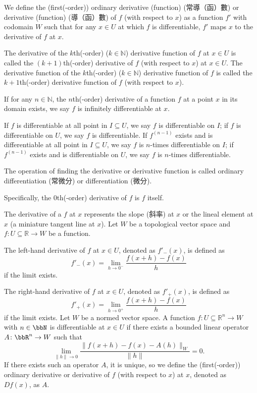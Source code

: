 \documentclass[a4paper,12pt]{report}
\begin{document}
\begin{itemize}
\begin{itemize}
We define the (first(-order)) ordinary derivative (function) (常導（函）數) or derivative (function) (導（函）數) of $f$ (with respect to $x$) as a function $f'$ with codomain $W$ such that for any $x\in U$ at which $f$ is differentiable, $f'$ maps $x$ to the derivative of $f$ at $x$.

The derivative of the $k$th(-order) ($k\in\mathbb{N}$) derivative function of $f$ at $x\in U$ is called the $(k+1)$th(-order) derivative of $f$ (with respect to $x$) at $x\in U$. The derivative function of the $k$th(-order) ($k\in\mathbb{N}$) derivative function of $f$ is called the $k+1$th(-order) derivative function of $f$ (with respect to $x$).

If for any $n\in\mathbb{N}$, the $n$th(-order) derivative of a function $f$ at a point $x$ in its domain exists, we say $f$ is infinitely differentiable at $x$.

If $f$ is differentiable at all point in $I\subseteq U$, we say $f$ is differentiable on $I$; if $f$ is differentiable on $U$, we say $f$ is differentiable. If $f^{(n-1)}$ exists and is differentiable at all point in $I\subseteq U$, we say $f$ is $n$-times differentiable on $I$; if $f^{(n-1)}$ exists and is differentiable on $U$, we say $f$ is $n$-times differentiable.

The operation of finding the derivative or derivative function is called ordinary differentiation (常微分) or differentiation (微分).

Specifically, the $0$th(-order) derivative of $f$ is $f$ itself.

The derivative of a $f$ at $x$ represents the slope (斜率) at $x$ or the lineal element at $x$ (a miniature tangent line at $x$).
Let $W$ be a topological vector space and $f\colon U\subseteq\mathbb{R}\to W$ be a function.

The left-hand derivative of $f$ at $x\in U$, denoted as $f'_-(x)$, is defined as
\[f'_-(x)=\lim_{h\to 0^-}\frac{f(x+h)-f(x)}{h}\]
if the limit exists.

The right-hand derivative of $f$ at $x\in U$, denoted as $f'_+(x)$, is defined as
\[f'_+(x)=\lim_{h\to 0^+}\frac{f(x+h)-f(x)}{h}\]
if the limit exists.
Let $W$ be a normed vector space. A function $f\colon U\subseteq\mathbb{R}^n\to W$ with $n\in\bbN$ is differentiable at $x\in U$ if there exists a bounded linear operator $A\colon\bbR^n\to W$ such that
\[\lim_{\|h\|\to 0}\frac{\|f(x+h)-f(x)-A(h)\|_W}{\|h\|}=0.\]
If there exists such an operator $A$, it is unique, so we define the (first(-order)) ordinary derivative or derivative of $f$ (with respect to $x$) at $x$, denoted as $Df(x)$, as $A$.


\end{itemize}
\end{itemize}
\end{document}
